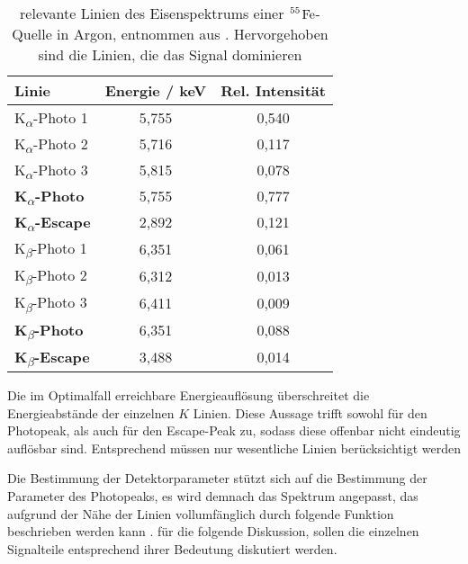 			\begin{table}[h!]
				\centering
				\begin{tabular}{|l|c|c|}
					\hline
					\textbf{Linie} & \textbf{Energie / keV} & \textbf{Rel. Intensität} \\ \hline
					K\textsubscript{$\alpha$}-Photo 1    & 5,755         & 0,540           \\ \hline
					K\textsubscript{$\alpha$}-Photo 2    & 5,716         & 0,117           \\ \hline
					K\textsubscript{$\alpha$}-Photo 3    & 5,815         & 0,078           \\ \hline
					\textbf{K\textsubscript{$\alpha$}-Photo}  & 5,755         & 0,777           \\ \hline
					\textbf{K\textsubscript{$\alpha$}-Escape} & 2,892         & 0,121           \\ \hline
					K\textsubscript{$\beta$}-Photo 1     & 6,351         & 0,061           \\ \hline
					K\textsubscript{$\beta$}-Photo 2     & 6,312         & 0,013           \\ \hline
					K\textsubscript{$\beta$}-Photo 3     & 6,411         & 0,009           \\ \hline
					\textbf{K\textsubscript{$\beta$}-Photo}  & 6,351         & 0,088           \\ \hline
					\textbf{K\textsubscript{$\beta$}-Escape} & 3,488         & 0,014           \\ \hline
				\end{tabular}
				\caption{relevante Linien des Eisenspektrums einer $\ce{^55 Fe}$-Quelle in Argon, entnommen aus \cite{ottnad}. Hervorgehoben sind die Linien, die das Signal dominieren}
				\label{tab:Eisenlinien}
			\end{table}
			
			
			\noindent Die im Optimalfall erreichbare Energieauflösung überschreitet die Energieabstände der einzelnen $K$ Linien. Diese Aussage trifft sowohl für den Photopeak, als auch für den Escape-Peak zu, sodass diese offenbar nicht eindeutig auflösbar sind. Entsprechend müssen nur wesentliche Linien berücksichtigt werden
			
			
			
			 Die Bestimmung der Detektorparameter stützt sich auf die Bestimmung der Parameter des Photopeaks, es wird demnach das Spektrum angepasst, das aufgrund der Nähe der Linien vollumfänglich durch folgende Funktion beschrieben werden kann \cite{Hauer}. für die folgende Diskussion, sollen die einzelnen Signalteile entsprechend ihrer Bedeutung diskutiert werden.
			 

